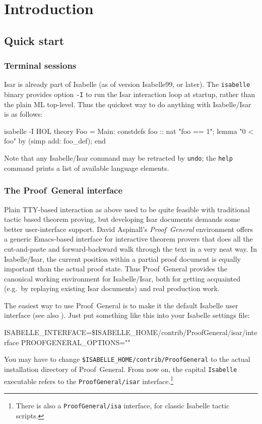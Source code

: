 
\chapter{Introduction}

\section{Quick start}

\subsection{Terminal sessions}

Isar is already part of Isabelle (as of version Isabelle99, or later).  The
\texttt{isabelle} binary provides option \texttt{-I} to run the Isar
interaction loop at startup, rather than the plain ML top-level.  Thus the
quickest way to do anything with Isabelle/Isar is as follows:
\begin{ttbox}
isabelle -I HOL\medskip
{}\medskip
theory Foo = Main:
constdefs foo :: nat  "foo == 1";
lemma "0 < foo" by (simp add: foo_def);
end
\end{ttbox}
Note that any Isabelle/Isar command may be retracted by \texttt{undo}; the
\texttt{help} command prints a list of available language elements.


\subsection{The Proof~General interface}

Plain TTY-based interaction as above used to be quite feasible with
traditional tactic based theorem proving, but developing Isar documents
demands some better user-interface support.  David Aspinall's
\emph{Proof~General} environment
\cite{proofgeneral,Aspinall:TACAS:2000} offers a generic Emacs-based interface
for interactive theorem provers that does all the cut-and-paste and
forward-backward walk through the text in a very neat way.  In Isabelle/Isar,
the current position within a partial proof document is equally important than
the actual proof state.  Thus Proof~General provides the canonical working
environment for Isabelle/Isar, both for getting acquainted (e.g.\ by replaying
existing Isar documents) and real production work.

\medskip

The easiest way to use Proof~General is to make it the default Isabelle user
interface (see also \cite{isabelle-sys}).  Just put something like this into
your Isabelle settings file:
\begin{ttbox}
ISABELLE_INTERFACE=\$ISABELLE_HOME/contrib/ProofGeneral/isar/interface
PROOFGENERAL_OPTIONS=""
\end{ttbox}
You may have to change \texttt{\$ISABELLE_HOME/contrib/ProofGeneral} to the
actual installation directory of Proof~General.  From now on, the capital
\texttt{Isabelle} executable refers to the \texttt{ProofGeneral/isar}
interface.\footnote{There is also a \texttt{ProofGeneral/isa} interface, for
  classic Isabelle tactic scripts.}

